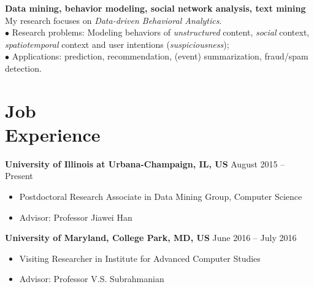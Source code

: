 \documentclass[margin, 10pt]{res}
\begin{document}
\begin{resume}
\textbf{Data mining, behavior modeling, social network analysis, text mining} \\
My research focuses on \emph{Data-driven Behavioral Analytics}. \\
$\bullet$ {Research problems:} Modeling behaviors of \emph{unstructured} content, \emph{social} context, \emph{spatiotemporal} context and user intentions (\emph{suspiciousness}); \\
$\bullet$ {Applications:} prediction, recommendation, (event) summarization, fraud/spam detection.


\section{Job \\ Experience}

\textbf{University of Illinois at Urbana-Champaign, IL, US} \hfill{August 2015 -- Present}
\begin{itemize} \itemsep -2pt
	\item Postdoctoral Research Associate in Data Mining Group, Computer Science
	\item Advisor: Professor Jiawei Han
\end{itemize}

\textbf{University of Maryland, College Park, MD, US} \hfill{June 2016 -- July 2016}
\begin{itemize} \itemsep -2pt
	\item Visiting Researcher in Institute for Advanced Computer Studies
	\item Advisor: Professor V.S. Subrahmanian
\end{itemize}


\end{resume}
\end{document}
